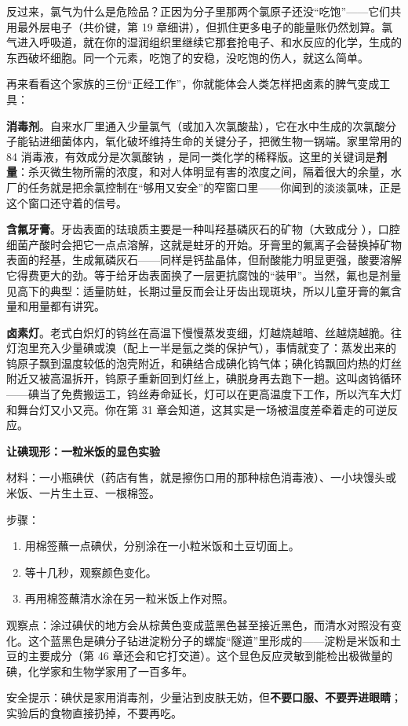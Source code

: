 反过来，氯气为什么是危险品？正因为分子里那两个氯原子还没“吃饱”——它们共用最外层电子（共价键，第 19 章细讲），但抓住更多电子的能量账仍然划算。氯气进入呼吸道，就在你的湿润组织里继续它那套抢电子、和水反应的化学，生成的东西破坏细胞。同一个元素，吃饱了的安稳，没吃饱的伤人，就这么简单。

再来看看这个家族的三份“正经工作”，你就能体会人类怎样把卤素的脾气变成工具：

\textbf{消毒剂}。自来水厂里通入少量氯气（或加入次氯酸盐），它在水中生成的次氯酸分子能钻进细菌体内，氧化破坏维持生命的关键分子，把微生物一锅端。家里常用的 84 消毒液，有效成分是次氯酸钠 ，是同一类化学的稀释版。这里的关键词是\textbf{剂量}：杀灭微生物所需的浓度，和对人体明显有害的浓度之间，隔着很大的余量，水厂的任务就是把余氯控制在“够用又安全”的窄窗口里——你闻到的淡淡氯味，正是这个窗口还守着的信号。

\textbf{含氟牙膏}。牙齿表面的珐琅质主要是一种叫羟基磷灰石的矿物（大致成分 ），口腔细菌产酸时会把它一点点溶解，这就是蛀牙的开始。牙膏里的氟离子会替换掉矿物表面的羟基，生成氟磷灰石——同样是钙盐晶体，但耐酸能力明显更强，酸要溶解它得费更大的劲。等于给牙齿表面换了一层更抗腐蚀的“装甲”。当然，氟也是剂量见高下的典型：适量防蛀，长期过量反而会让牙齿出现斑块，所以儿童牙膏的氟含量和用量都有讲究。

\textbf{卤素灯}。老式白炽灯的钨丝在高温下慢慢蒸发变细，灯越烧越暗、丝越烧越脆。往灯泡里充入少量碘或溴（配上一半是氩之类的保护气），事情就变了：蒸发出来的钨原子飘到温度较低的泡壳附近，和碘结合成碘化钨气体；碘化钨飘回灼热的灯丝附近又被高温拆开，钨原子重新回到灯丝上，碘脱身再去跑下一趟。这叫卤钨循环——碘当了免费搬运工，钨丝寿命延长，灯可以在更高温度下工作，所以汽车大灯和舞台灯又小又亮。你在第 31 章会知道，这其实是一场被温度差牵着走的可逆反应。

\begin{shiyan}
\textbf{让碘现形：一粒米饭的显色实验}

材料：一小瓶碘伏（药店有售，就是擦伤口用的那种棕色消毒液）、一小块馒头或米饭、一片生土豆、一根棉签。

步骤：
\begin{enumerate}[itemsep=1pt]
\item 用棉签蘸一点碘伏，分别涂在一小粒米饭和土豆切面上。
\item 等十几秒，观察颜色变化。
\item 再用棉签蘸清水涂在另一粒米饭上作对照。
\end{enumerate}

观察点：涂过碘伏的地方会从棕黄色变成蓝黑色甚至接近黑色，而清水对照没有变化。这个蓝黑色是碘分子钻进淀粉分子的螺旋“隧道”里形成的——淀粉是米饭和土豆的主要成分（第 46 章还会和它打交道）。这个显色反应灵敏到能检出极微量的碘，化学家和生物学家用了一百多年。

安全提示：碘伏是家用消毒剂，少量沾到皮肤无妨，但\textbf{不要口服、不要弄进眼睛}；实验后的食物直接扔掉，不要再吃。
\end{shiyan}

